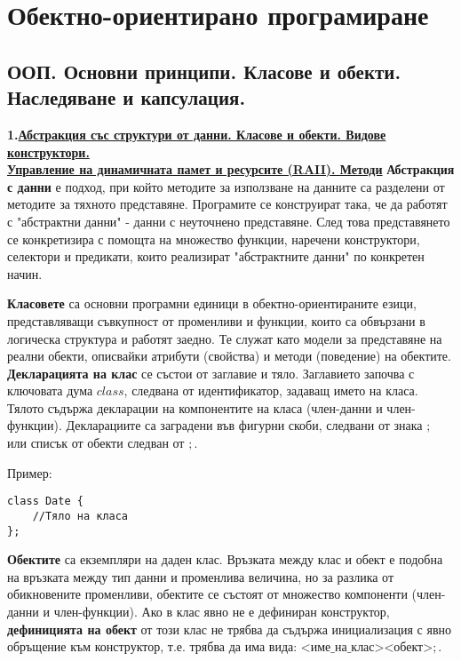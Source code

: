 \documentclass{article}
\begin{document}
\section*{Обектно-ориентирано програмиране}

\subsection*{ООП. Основни принципи. Класове и обекти. Наследяване и капсулация.}

\textbf{1.\underline{Абстракция със структури от данни. Класове и обекти. Видове конструктори.} \\
\underline{Управление на динамичната памет и ресурсите (RAII). Методи}} \newline\newline
\textbf{Абстракция с данни} е подход, при който методите за използване на данните са разделени от методите за тяхното представяне.
Програмите се конструират така, че да работят с "абстрактни данни" - данни с неуточнено представяне. След това представянето се
конкретизира с помощта на множество функции, наречени конструктори, селектори и предикати, които реализират "абстрактните данни"
по конкретен начин.

\textbf{Класовете} са основни програмни единици в обектно-ориентираните езици, представляващи съвкупност от променливи и функции,
които са обвързани в логическа структура и работят заедно. Те служат като модели за представяне на реални обекти, описвайки
атрибути (свойства) и методи (поведение) на обектите. \newline
\textbf{Декларацията на клас} се състои от заглавие и тяло. Заглавието започва с ключовата дума $class$, следвана от идентификатор,
задаващ името на класа. Тялото съдържа декларации на компонентите на класа (член-данни и член-функции). Декларациите са заградени
във фигурни скоби, следвани от знака $;$ или списък от обекти следван от $;$.

Пример: \begin{lstlisting}
class Date {
    //Тяло на класа
};
\end{lstlisting}
\textbf{Обектите} са екземпляри на даден клас. Връзката между клас и обект е подобна на връзката между тип данни и променлива
величина, но за разлика от обикновените променливи, обектите се състоят от множество компоненти (член-данни и член-функции).
Ако в клас явно не е дефиниран конструктор, \textbf{дефиницията на обект} от този клас не трябва да съдържа инициализация с явно
обръщение към конструктор, т.е. трябва да има вида: $\text{<име\_на\_клас><обект>};$.
\end{document}
